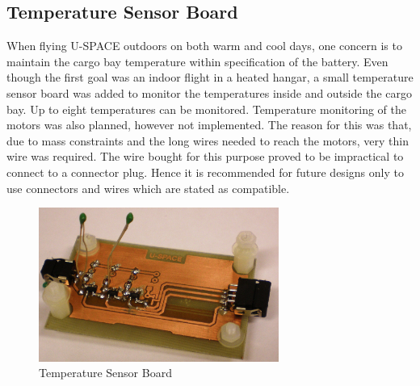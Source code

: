 \subsection{Temperature Sensor Board}
%
When flying U-SPACE outdoors on both warm and cool days, one concern is to maintain the cargo bay temperature within specification of the battery. Even though the first goal was an indoor flight in a heated hangar, a small temperature sensor board was added to monitor the temperatures inside and outside the cargo bay. Up to eight temperatures can be monitored. Temperature monitoring of the motors was also planned, however not implemented. The reason for this was that, due to mass constraints and the long wires needed to reach the motors, very thin wire was required. The wire bought for this purpose proved to be impractical to connect to a connector plug. Hence it is recommended for future designs only to use connectors and wires which are stated as compatible.
%
\begin{figure}[H]
\centering
\includegraphics[width=0.7\textwidth]{figures/fig_Temp_top}
\caption{Temperature Sensor Board}
\label{fig:TS_top}
\end{figure}
%
